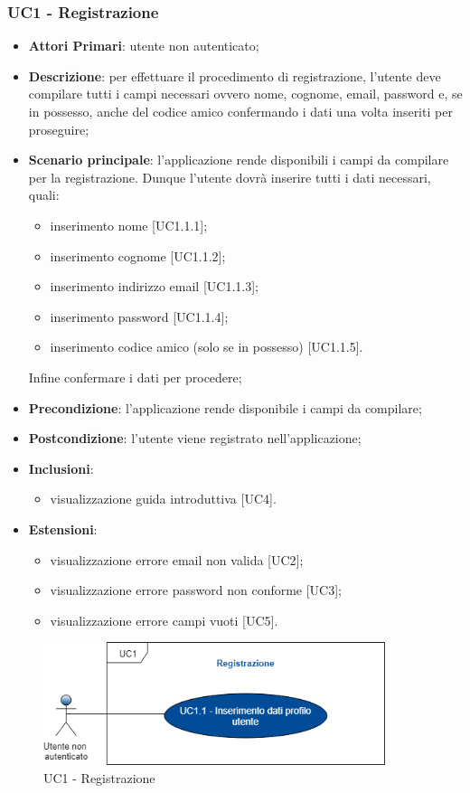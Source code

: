 \subsubsection{UC1 - Registrazione}
\begin{itemize}
	\item \textbf{Attori Primari}: utente non autenticato;
	\item \textbf{Descrizione}: per effettuare il procedimento di registrazione, l'utente deve compilare tutti i campi necessari ovvero nome, cognome, email, password e, se in possesso, anche del codice amico confermando i dati una volta inseriti per proseguire;
	\item \textbf{Scenario principale}: l'applicazione rende disponibili i campi da compilare per la registrazione. Dunque l'utente dovrà inserire tutti i dati necessari, quali:
		\begin{itemize}
			\item inserimento nome [UC1.1.1];
			\item inserimento cognome [UC1.1.2];
			\item inserimento indirizzo email [UC1.1.3];
			\item inserimento password [UC1.1.4];
			\item inserimento codice amico (solo se in possesso) [UC1.1.5].
		\end{itemize}
	Infine confermare i dati per procedere;
	\item \textbf{Precondizione}: l'applicazione rende disponibile i campi da compilare;
	\item \textbf{Postcondizione}: l'utente viene registrato nell'applicazione;
	\item \textbf{Inclusioni}:
		\begin{itemize}
			\item visualizzazione guida introduttiva [UC4].
		\end{itemize}
	\item \textbf{Estensioni}:
		\begin{itemize}
			\item visualizzazione errore email non valida [UC2];
			\item visualizzazione errore password non conforme [UC3];
			\item visualizzazione errore campi vuoti [UC5]. 
		\end{itemize} 
\end{itemize}
\begin{figure}[h]
	\includegraphics[width=10cm]{res/images/UC1Registrazione.png}
	\centering
	\caption{UC1 - Registrazione}
\end{figure}
